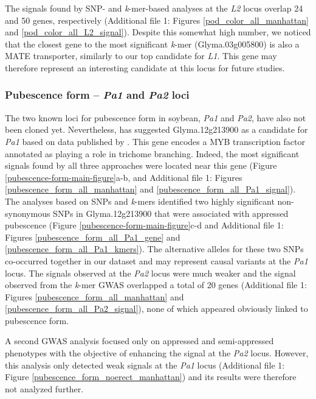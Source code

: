 The signals found by SNP- and \emph{k}-mer-based analyses at the \textit{L2}
locus overlap 24 and 50 genes, respectively (Additional file 1: Figures
\ref{pod_color_all_manhattan} and \ref{pod_color_all_L2_signal}). Despite this
somewhat high number, we noticed that the closest gene to the most significant
\emph{k}-mer (Glyma.03g005800) is also a MATE transporter, similarly to our top
candidate for \emph{L1}. This gene may therefore represent an interesting
candidate at this locus for future studies.

\subsubsection*{Pubescence form -- \textit{Pa1} and \textit{Pa2} loci}
\label{sv-gwas-main-results-pubescence-form-pa1-pa2}

The two known loci for pubescence form in soybean, \textit{Pa1} and
\textit{Pa2}, have also not been cloned yet. Nevertheless, \cite{gilbert2017}
has suggested Glyma.12g213900 as a candidate for \textit{Pa1} based on data
published by \cite{bandillo2017}. This gene encodes a MYB transcription factor
annotated as playing a role in trichome branching. Indeed, the most significant
signals found by all three approaches were located near this gene (Figure
\ref{pubescence-form-main-figure}a-b, and Additional file 1: Figures \ref{pubescence_form_all_manhattan} and
\ref{pubescence_form_all_Pa1_signal}).  The analyses based on SNPs and
\emph{k}-mers identified two highly significant non-synonymous SNPs in
Glyma.12g213900 that were associated with appressed pubescence (Figure
\ref{pubescence-form-main-figure}c-d and Additional file 1: Figures \ref{pubescence_form_all_Pa1_gene} and
\ref{pubescence_form_all_Pa1_kmers}). The alternative alleles for these two
SNPs co-occurred together in our dataset and may represent causal variants at
the \emph{Pa1} locus. The signals observed at the \emph{Pa2} locus were much
weaker and the signal observed from the \emph{k}-mer GWAS overlapped a total of
20 genes (Additional file 1: Figures \ref{pubescence_form_all_manhattan} and
\ref{pubescence_form_all_Pa2_signal}), none of which appeared obviously linked
to pubescence form.

A second GWAS analysis focused only on appressed and semi-appressed phenotypes
with the objective of enhancing the signal at the \emph{Pa2} locus. However,
this analysis only detected weak signals at the \emph{Pa1} locus (Additional file 1: Figure
\ref{pubescence_form_noerect_manhattan}) and its results were therefore not
analyzed further.

